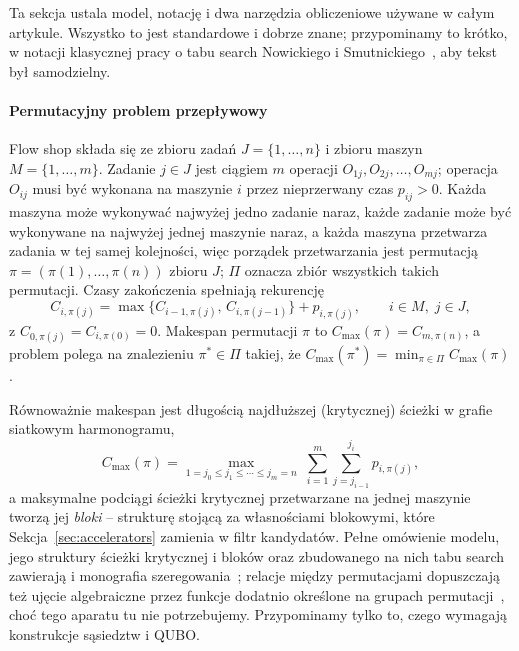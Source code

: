 \documentclass[11pt,a4paper]{article}
\begin{document}
Ta sekcja ustala model, notację i dwa narzędzia obliczeniowe używane
w całym artykule. Wszystko to jest standardowe i dobrze znane;
przypominamy to krótko, w notacji klasycznej pracy o tabu search
Nowickiego i Smutnickiego~\citep{nowicki96}, aby tekst był samodzielny.

\paragraph{Permutacyjny problem przepływowy}
Flow shop składa się ze zbioru zadań $J=\{1,\ldots,n\}$ i zbioru maszyn
$M=\{1,\ldots,m\}$. Zadanie $j\in J$ jest ciągiem $m$ operacji
$O_{1j}, O_{2j}, \ldots, O_{mj}$; operacja $O_{ij}$ musi być wykonana na
maszynie $i$ przez nieprzerwany czas $p_{ij}>0$. Każda maszyna może
wykonywać najwyżej jedno zadanie naraz, każde zadanie może być
wykonywane na najwyżej jednej maszynie naraz, a każda maszyna
przetwarza zadania w tej samej kolejności, więc porządek przetwarzania
jest permutacją $\pi=(\pi(1),\ldots,\pi(n))$ zbioru $J$; $\Pi$ oznacza
zbiór wszystkich takich permutacji. Czasy zakończenia spełniają
rekurencję
\begin{equation}
  C_{i,\pi(j)} = \max\!\bigl\{C_{i-1,\pi(j)},\, C_{i,\pi(j-1)}\bigr\}
  + p_{i,\pi(j)}, \qquad i \in M,\; j \in J,
\end{equation}
z $C_{0,\pi(j)} = C_{i,\pi(0)} = 0$. Makespan permutacji $\pi$ to
$C_{\max}(\pi) = C_{m,\pi(n)}$, a problem polega na znalezieniu
$\pi^*\in\Pi$ takiej, że
$C_{\max}(\pi^*) = \min_{\pi\in\Pi} C_{\max}(\pi)$.

Równoważnie makespan jest długością najdłuższej (krytycznej) ścieżki
w grafie siatkowym harmonogramu,
\begin{equation}
  C_{\max}(\pi) = \max_{1 = j_0 \leq j_1 \leq \cdots \leq j_m = n}\;
  \sum_{i=1}^{m} \sum_{j=j_{i-1}}^{j_i} p_{i,\pi(j)},
  \label{eq:critpath}
\end{equation}
a maksymalne podciągi ścieżki krytycznej przetwarzane na jednej
maszynie tworzą jej \emph{bloki} -- strukturę stojącą za własnościami
blokowymi, które Sekcja~\ref{sec:accelerators} zamienia w filtr
kandydatów. Pełne omówienie modelu, jego struktury ścieżki krytycznej
i bloków oraz zbudowanego na nich tabu search zawierają
\citep{nowicki96} i monografia szeregowania~\citep{smutnicki2012};
relacje między permutacjami dopuszczają też ujęcie algebraiczne przez
funkcje dodatnio określone na grupach permutacji~\citep{bozejko2015},
choć tego aparatu tu nie potrzebujemy. Przypominamy tylko to, czego
wymagają konstrukcje sąsiedztw i QUBO.
\end{document}
